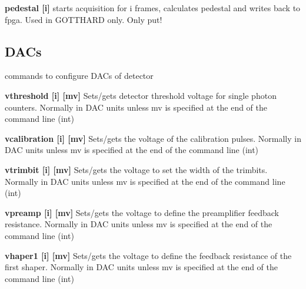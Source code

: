 \begin{DoxyItemize}
\item {\bfseries pedestal \mbox{[}i\mbox{]}} starts acquisition for i frames, calculates pedestal and writes back to fpga. Used in GOTTHARD only. Only put!
\end{DoxyItemize}\hypertarget{settings_settingsdacs}{}\subsection{DACs}\label{settings_settingsdacs}
commands to configure DACs of detector


\begin{DoxyItemize}
\item {\bfseries vthreshold \mbox{[}i\mbox{]} \mbox{[}mv\mbox{]}} Sets/gets detector threshold voltage for single photon counters. Normally in DAC units unless {\ttfamily mv} is specified at the end of the command line (int)
\end{DoxyItemize}


\begin{DoxyItemize}
\item {\bfseries vcalibration \mbox{[}i\mbox{]} \mbox{[}mv\mbox{]}} Sets/gets the voltage of the calibration pulses. Normally in DAC units unless {\ttfamily mv} is specified at the end of the command line (int)
\end{DoxyItemize}


\begin{DoxyItemize}
\item {\bfseries vtrimbit \mbox{[}i\mbox{]} \mbox{[}mv\mbox{]}} Sets/gets the voltage to set the width of the trimbits. Normally in DAC units unless {\ttfamily mv} is specified at the end of the command line (int)
\end{DoxyItemize}


\begin{DoxyItemize}
\item {\bfseries vpreamp \mbox{[}i\mbox{]} \mbox{[}mv\mbox{]}} Sets/gets the voltage to define the preamplifier feedback resistance. Normally in DAC units unless {\ttfamily mv} is specified at the end of the command line (int)
\end{DoxyItemize}


\begin{DoxyItemize}
\item {\bfseries vhaper1 \mbox{[}i\mbox{]} \mbox{[}mv\mbox{]}} Sets/gets the voltage to define the feedback resistance of the first shaper. Normally in DAC units unless {\ttfamily mv} is specified at the end of the command line (int)
\end{DoxyItemize}


